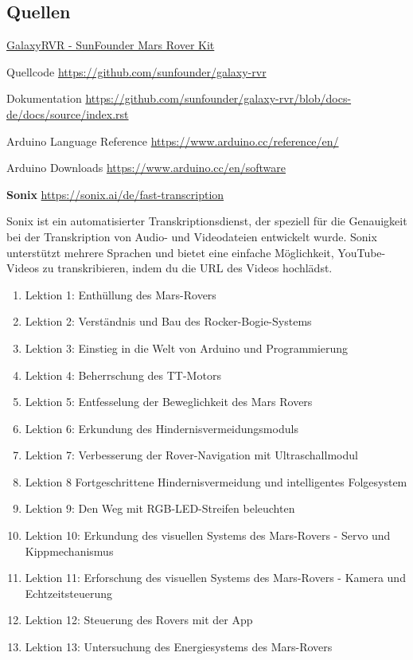 \documentclass{vorlage-design-main}
\begin{document}
\hypertarget{quellen}{%
\subsection{Quellen}\label{quellen}}

\href{https://docs.sunfounder.com/projects/galaxy-rvr/de/latest/index.html}{GalaxyRVR
- SunFounder Mars Rover Kit}

Quellcode \url{https://github.com/sunfounder/galaxy-rvr}

Dokumentation
\url{https://github.com/sunfounder/galaxy-rvr/blob/docs-de/docs/source/index.rst}

Arduino Language Reference \url{https://www.arduino.cc/reference/en/}

Arduino Downloads \url{https://www.arduino.cc/en/software}

\textbf{Sonix} \url{https://sonix.ai/de/fast-transcription}

Sonix ist ein automatisierter Transkriptionsdienst, der speziell für die
Genauigkeit bei der Transkription von Audio- und Videodateien entwickelt
wurde. Sonix unterstützt mehrere Sprachen und bietet eine einfache
Möglichkeit, YouTube-Videos zu transkribieren, indem du die URL des
Videos hochlädst.

\begin{enumerate}
\def\labelenumi{\arabic{enumi}.}

\item
  Lektion 1: Enthüllung des Mars-Rovers
\item
  Lektion 2: Verständnis und Bau des Rocker-Bogie-Systems
\item
  Lektion 3: Einstieg in die Welt von Arduino und Programmierung
\item
  Lektion 4: Beherrschung des TT-Motors
\item
  Lektion 5: Entfesselung der Beweglichkeit des Mars Rovers
\item
  Lektion 6: Erkundung des Hindernisvermeidungsmoduls
\item
  Lektion 7: Verbesserung der Rover-Navigation mit Ultraschallmodul
\item
  Lektion 8 Fortgeschrittene Hindernisvermeidung und intelligentes
  Folgesystem
\item
  Lektion 9: Den Weg mit RGB-LED-Streifen beleuchten
\item
  Lektion 10: Erkundung des visuellen Systems des Mars-Rovers - Servo
  und Kippmechanismus
\item
  Lektion 11: Erforschung des visuellen Systems des Mars-Rovers - Kamera
  und Echtzeitsteuerung
\item
  Lektion 12: Steuerung des Rovers mit der App
\item
  Lektion 13: Untersuchung des Energiesystems des Mars-Rovers
\end{enumerate}
\end{document}
